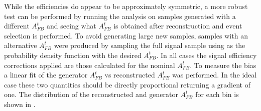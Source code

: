 While the efficiencies do appear to be approximately symmetric, a more robust test can be performed by running the analysis on samples generated with a different $A_{FB}^t$ and seeing what $A_{FB}^t$ is obtained after reconstruction and event selection is performed. To avoid generating large new samples, samples with an alternative $A_{FB}^t$ were produced by sampling the full signal sample using  as the probability density function with the desired $A_{FB}^t$. In all cases the signal efficiency corrections applied are those calculated for the nominal $A_{FB}^t$. To measure the bias a linear fit of the generator $A_{FB}^t$ vs reconstructed $A_{FB}^t$ was performed. In the ideal case these two quantities should be directly proportional returning a gradient of one. The distribution of the reconstructed and generator $A_{FB}^t$ for each bin is shown in .


